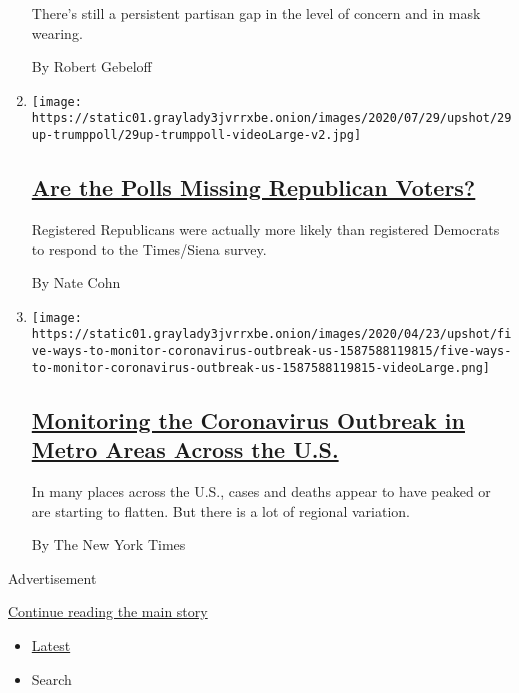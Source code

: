 \begin{enumerate}
  There's still a persistent partisan gap in the level of concern and in
  mask wearing.

  By Robert Gebeloff
\item
  \texttt{[image: https://static01.graylady3jvrrxbe.onion/images/2020/07/29/upshot/29up-trumppoll/29up-trumppoll-videoLarge-v2.jpg]}

  \hypertarget{are-the-polls-missing-republican-voters}{%
  \subsection{\texorpdfstring{\href{/2020/07/29/upshot/polls-political-party-republicans.html}{Are
  the Polls Missing Republican
  Voters?}}{Are the Polls Missing Republican Voters?}}\label{are-the-polls-missing-republican-voters}}

  Registered Republicans were actually more likely than registered
  Democrats to respond to the Times/Siena survey.

  By Nate Cohn
\item
  \texttt{[image: https://static01.graylady3jvrrxbe.onion/images/2020/04/23/upshot/five-ways-to-monitor-coronavirus-outbreak-us-1587588119815/five-ways-to-monitor-coronavirus-outbreak-us-1587588119815-videoLarge.png]}

  \hypertarget{monitoring-the-coronavirus-outbreak-in-metro-areas-across-the-us}{%
  \subsection{\texorpdfstring{\href{/interactive/2020/04/23/upshot/five-ways-to-monitor-coronavirus-outbreak-us.html}{Monitoring
  the Coronavirus Outbreak in Metro Areas Across the
  U.S.}}{Monitoring the Coronavirus Outbreak in Metro Areas Across the U.S.}}\label{monitoring-the-coronavirus-outbreak-in-metro-areas-across-the-us}}

  In many places across the U.S., cases and deaths appear to have peaked
  or are starting to flatten. But there is a lot of regional variation.

  By The New York Times
\end{enumerate}

Advertisement

\protect\hyperlink{after-mid1}{Continue reading the main story}

\begin{itemize}
\tightlist
\item
  \protect\hyperlink{stream-panel}{Latest}
\item
  Search
\end{itemize}

